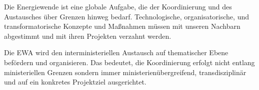 Die Energiewende ist eine globale Aufgabe, die der Koordinierung und des Austausches über Grenzen hinweg bedarf.
Technologische, organisatorische, und transformatorische Konzepte und Maßnahmen müssen mit unseren Nachbarn abgestimmt und mit ihren Projekten verzahnt werden.

Die EWA wird den interministeriellen Austausch auf thematischer Ebene befördern und organisieren. 
Das bedeutet, die Koordinierung erfolgt nicht entlang ministeriellen Grenzen sondern immer ministerienübergreifend, transdisziplinär und auf ein konkretes Projektziel ausgerichtet.

